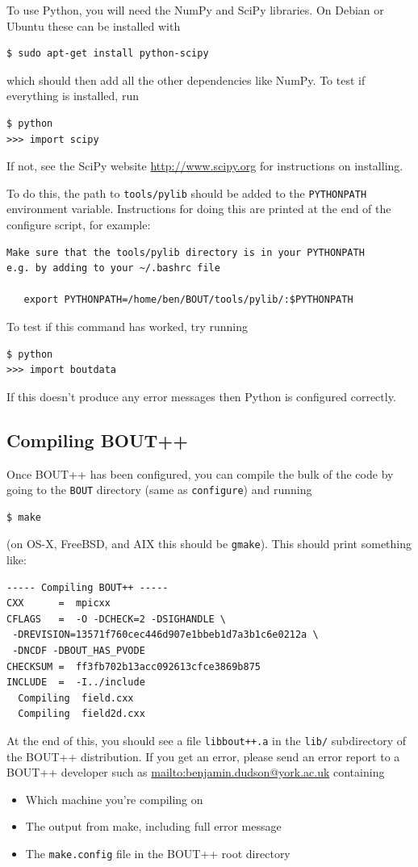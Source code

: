 \documentclass[12pt]{article}
\begin{document}
To use Python, you will need the NumPy and SciPy libraries. On Debian or Ubuntu
these can be installed with
\begin{verbatim}
$ sudo apt-get install python-scipy  
\end{verbatim}
which should then add all the other dependencies like NumPy. To test if everything is installed, run
\begin{verbatim}
$ python
>>> import scipy 
\end{verbatim}
If not, see the SciPy website \url{http://www.scipy.org} for instructions
on installing. 

To do this, the path to
\texttt{tools/pylib} should be added to the \texttt{PYTHONPATH} environment variable.
Instructions for doing this are printed at the end of the configure script, for example:

\begin{verbatim}
Make sure that the tools/pylib directory is in your PYTHONPATH
e.g. by adding to your ~/.bashrc file

   export PYTHONPATH=/home/ben/BOUT/tools/pylib/:$PYTHONPATH

\end{verbatim}
To test if this command has worked, try running
\begin{verbatim}
$ python
>>> import boutdata
\end{verbatim}
If this doesn't produce any error messages then Python is configured correctly.

\subsection{Compiling BOUT++}
\label{sec:installbout}

Once BOUT++ has been configured, you can compile the bulk of the code
by going to the \texttt{BOUT} directory (same as \texttt{configure}) and running
\begin{verbatim}
$ make
\end{verbatim}
(on OS-X, FreeBSD, and AIX this should be \texttt{gmake}). This should print something like:
\begin{verbatim}
----- Compiling BOUT++ -----
CXX      =  mpicxx
CFLAGS   =  -O -DCHECK=2 -DSIGHANDLE \
 -DREVISION=13571f760cec446d907e1bbeb1d7a3b1c6e0212a \
 -DNCDF -DBOUT_HAS_PVODE
CHECKSUM =  ff3fb702b13acc092613cfce3869b875
INCLUDE  =  -I../include
  Compiling  field.cxx
  Compiling  field2d.cxx
\end{verbatim}

At the end of this, you should see a file \texttt{libbout++.a} in
the \texttt{lib/} subdirectory of the BOUT++ distribution. If you
get an error, please send an error report to a BOUT++ developer
such as \url{mailto:benjamin.dudson@york.ac.uk} containing
\begin{itemize}
\item Which machine you're compiling on
\item The output from make, including full error message
\item The \texttt{make.config} file in the BOUT++ root directory
\end{itemize}
\end{document}
